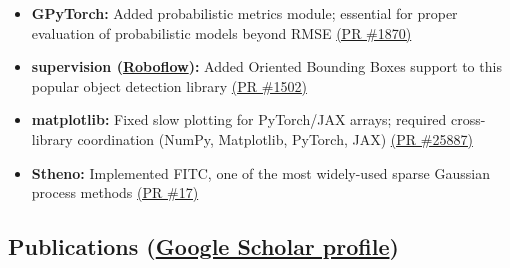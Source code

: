 \documentclass[letter,10pt]{article}
\begin{document}
\begin{itemize}
    \item[] \textbf{GPyTorch:} Added probabilistic metrics module; essential for proper evaluation of probabilistic models beyond RMSE \href{https://github.com/cornellius-gp/gpytorch/pull/1870}{(PR \#1870)}
\item[] \textbf{supervision (\href{https://roboflow.com/}{Roboflow}):} Added Oriented Bounding Boxes support to this popular object detection library \href{https://github.com/roboflow/supervision/pull/1502}{(PR \#1502)}
\item[] \textbf{matplotlib:} Fixed slow plotting for PyTorch/JAX arrays; required cross-library coordination (NumPy, Matplotlib, PyTorch, JAX) \href{https://github.com/matplotlib/matplotlib/pull/25887}{(PR \#25887)}
\item[] \textbf{Stheno:} Implemented FITC, one of the most widely-used sparse Gaussian process methods \href{https://github.com/wesselb/stheno/pull/17}{(PR \#17)}
\end{itemize}

\subsection*{{\sc \textbf{Publications} (\href{https://scholar.google.com/citations?user=7LY1_u4AAAAJ&hl=en}{Google Scholar profile})}\hspace{5pt}\noindent\hrulefill}
\end{document}
